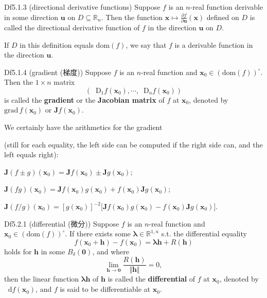 \documentclass{article}
\newcommand{\parfrac}[2]{\frac{\partial #1}{\partial #2}}
\newcommand{\dif}{\mathop{}\!\mathrm{d}}
\newcommand{\Dif}{\mathop{}\!\mathrm{D}}
\begin{document}
\begin{Df}{Df5.1.3 (directional derivative functions)}
    Suppose $f$ is an $n$-real function derivable in some direction $\pmb{u}$ on $D\subseteq\mathbb{R}_n$. Then the function $\pmb{x}\mapsto \parfrac{f}{\pmb{u}}(\pmb{x})$ defined on $D$ is called the directional derivative function of $f$ in the direction $\pmb{u}$ on $D$.
\end{Df}

\begin{Rmk}{}
    \textcolor{Df}{If $D$ in this definition equals $\text{dom}(f)$, we say that $f$ is a derivable function in the direction $\pmb{u}$.}
\end{Rmk}

\begin{Df}{Df5.1.4 (gradient (梯度))}
    Suppose $f$ is an $n$-real function and $\pmb{x}_0\in (\text{dom}(f))^\circ$. Then the $1\times n$ matrix 
    $$(\Dif_1 f(\pmb{x}_0), \cdots, \Dif_n f(\pmb{x}_0))$$
    is called the \textbf{gradient} or the \textbf{Jacobian matrix} of $f$ at $\pmb{x}_0$, denoted by $\text{grad}\,f(\pmb{x}_0)$ or $\pmb{J}f(\pmb{x}_0)$.
\end{Df}

\begin{Rmk}{}
    We certainly have the arithmetics for the gradient \textcolor{Th}{(still for each equality, the left side can be computed if the right side can, and the left equals right): 
    \begin{compactenum}
        \item $\pmb{J}(f\pm g)(\pmb{x}_0) = \pmb{J}f(\pmb{x}_0)\pm\pmb{J}g(\pmb{x}_0)$;
        \item $\pmb{J}(fg)(\pmb{x}_0) = \pmb{J}f(\pmb{x}_0)g(\pmb{x}_0) + f(\pmb{x}_0)\pmb{J}g(\pmb{x}_0)$;
        \item $\pmb{J}(f/g)(\pmb{x}_0) = [g(\pmb{x}_0)]^{-2} \bigl[\pmb{J}f(\pmb{x}_0)g(\pmb{x}_0) - f(\pmb{x}_0)\pmb{J}g(\pmb{x}_0)\bigr]$.
    \end{compactenum}
    }
\end{Rmk}

\begin{Df}{Df5.2.1 (differential (微分))}
    Suppose $f$ is an $n$-real function and $\pmb{x}_0\in (\text{dom}(f))^\circ$. If there exists some $\pmb{\lambda}\in\mathbb{R}^{1,n}$ s.t. the differential equality
    $$ f(\pmb{x}_0 + \pmb{h}) - f(\pmb{x}_0) = \pmb{\lambda}\pmb{h} + R(\pmb{h}) $$
    holds for $\pmb{h}$ in some $B_\delta(\pmb{0})$, and where 
    $$\lim_{\pmb{h}\to \pmb{0}}\frac{R(\pmb{h})}{\Vert \pmb{h}\Vert} = 0,$$
    then the linear function $\pmb{\lambda h}$ of $\pmb{h}$ is called the \textbf{differential} of $f$ at $\pmb{x}_0$, denoted by $\dif f(\pmb{x}_0)$, and $f$ is said to be differentiable at $\pmb{x}_0$.
\end{Df}
\end{document}

